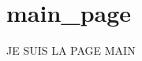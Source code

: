 \chapter{main\+\_\+page}
\hypertarget{md_network_2include_2main__page}{}\label{md_network_2include_2main__page}
JE SUIS LA PAGE MAIN 